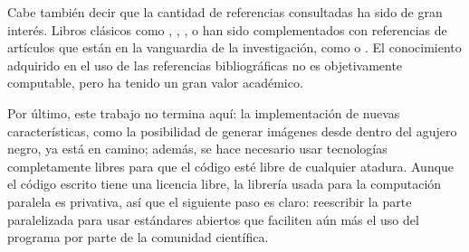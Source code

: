 Cabe también decir que la cantidad de referencias consultadas ha sido de gran interés. Libros clásicos como \cite{romero86}, \cite{oneill83}, \cite{docarmo79}, \cite{thorne73} o \cite{nomizu79} han sido complementados con referencias de artículos que están en la vanguardia de la investigación, como \cite{thorne15} o \cite{chan13}. El conocimiento adquirido en el uso de las referencias bibliográficas no es objetivamente computable, pero ha tenido un gran valor académico.

Por último, este trabajo no termina aquí: la implementación de nuevas características, como la posibilidad de generar imágenes desde dentro del agujero negro, ya está en camino; además, se hace necesario usar tecnologías completamente libres para que el código esté libre de cualquier atadura. Aunque el código escrito tiene una licencia libre, la librería usada para la computación paralela es privativa, así que el siguiente paso es claro: reescribir la parte paralelizada para usar estándares abiertos que faciliten aún más el uso del programa por parte de la comunidad científica.

\vfill

\endgroup

